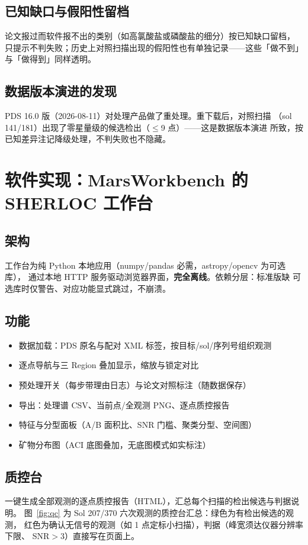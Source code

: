 \documentclass[11pt,a4paper]{ctexart}
\begin{document}
\subsection{已知缺口与假阳性留档}
论文报过而软件报不出的类别（如高氯酸盐或磷酸盐的细分）按已知缺口留档，
只提示不判失败；历史上对照扫描出现的假阳性也有单独记录——这些「做不到」
与「做得到」同样透明。

\subsection{数据版本演进的发现}
PDS 16.0 版（2026-08-11）对处理产品做了重处理。重下载后，对照扫描
（sol 141/181）出现了零星量级的候选检出（$\le$9 点）——这是数据版本演进
所致，按已知差异注记降级处理，不判失败也不隐藏。

\section{软件实现：MarsWorkbench 的 SHERLOC 工作台}

\subsection{架构}
工作台为纯 Python 本地应用（numpy/pandas 必需，astropy/opencv 为可选库），
通过本地 HTTP 服务驱动浏览器界面，\textbf{完全离线}。依赖分层：标准版缺
可选库时仅警告、对应功能显式跳过，不崩溃。

\subsection{功能}
\begin{itemize}
  \item 数据加载：PDS 原名与配对 XML 标签，按目标/sol/序列号组织观测
  \item 逐点导航与三 Region 叠加显示，缩放与锁定对比
  \item 预处理开关（每步带理由日志）与论文对照标注（随数据保存）
  \item 导出：处理谱 CSV、当前点/全观测 PNG、逐点质控报告
  \item 特征与分型面板（A/B 面积比、SNR 门槛、聚类分型、空间图）
  \item 矿物分布图（ACI 底图叠加，无底图模式如实标注）
\end{itemize}

\subsection{质控台}
一键生成全部观测的逐点质控报告（HTML），汇总每个扫描的检出候选与判据说明。
图~\ref{fig:qc} 为 Sol 207/370 六次观测的质控台汇总：绿色为有检出候选的观测，
红色为确认无信号的观测（如 1 点定标小扫描），判据（峰宽须达仪器分辨率下限、
SNR$>3$）直接写在页面上。
\end{document}
